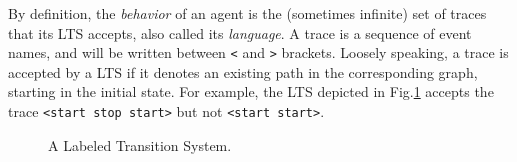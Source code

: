 By definition, the \emph{behavior} of an agent is the (sometimes infinite) set of traces that its LTS accepts, also called its \emph{language}. A trace is a sequence of event names, and will be written between \verb|<| and \verb|>| brackets. Loosely speaking, a trace is accepted by a LTS if it denotes an existing path in the corresponding graph, starting in the initial state. For example, the LTS depicted in Fig.\ref{image:framework-start-stop} accepts the trace \verb|<start stop start>| but not \verb|<start start>|.


\begin{figure}
\centering{}
  \caption{A Labeled Transition System\label{image:framework-start-stop}.}
\end{figure}

